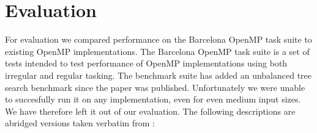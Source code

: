 \documentclass[sigconf]{acmart}
\begin{document}
\section{Evaluation} \label{Sec:Evaluation}

For evaluation we compared performance on the Barcelona OpenMP task suite
\cite{barcelona} to existing OpenMP implementations. The Barcelona OpenMP task
suite is a set of tests intended to test performance of OpenMP implementations
using both irregular and regular tasking. The benchmark suite has added an
unbalanced tree search benchmark since the paper was published. Unfortunately
we were unable to succesfully run it on any implementation, even for even
medium input sizes. We have therefore left it out of our evaluation. The
following descriptions are abridged versions taken verbatim from
\cite{barcelona}:
\end{document}
